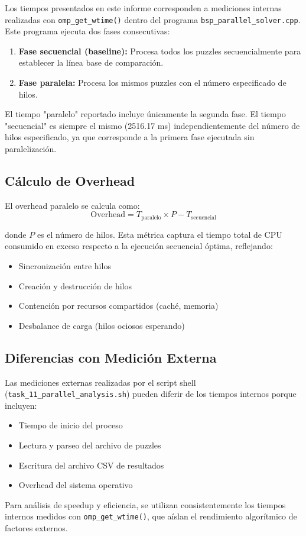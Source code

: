 \documentclass[12pt,a4paper]{article}
\begin{document}
Los tiempos presentados en este informe corresponden a mediciones internas realizadas con \texttt{omp\_get\_wtime()} dentro del programa \texttt{bsp\_parallel\_solver.cpp}. Este programa ejecuta dos fases consecutivas:

\begin{enumerate}
    \item \textbf{Fase secuencial (baseline):} Procesa todos los puzzles secuencialmente para establecer la línea base de comparación.
    \item \textbf{Fase paralela:} Procesa los mismos puzzles con el número especificado de hilos.
\end{enumerate}

El tiempo "paralelo" reportado incluye únicamente la segunda fase. El tiempo "secuencial" es siempre el mismo (2516.17 ms) independientemente del número de hilos especificado, ya que corresponde a la primera fase ejecutada sin paralelización.

\subsection{Cálculo de Overhead}

El overhead paralelo se calcula como:
\begin{equation}
\text{Overhead} = T_{\text{paralelo}} \times P - T_{\text{secuencial}}
\end{equation}

donde $P$ es el número de hilos. Esta métrica captura el tiempo total de CPU consumido en exceso respecto a la ejecución secuencial óptima, reflejando:
\begin{itemize}
    \item Sincronización entre hilos
    \item Creación y destrucción de hilos
    \item Contención por recursos compartidos (caché, memoria)
    \item Desbalance de carga (hilos ociosos esperando)
\end{itemize}

\subsection{Diferencias con Medición Externa}

Las mediciones externas realizadas por el script shell (\texttt{task\_11\_parallel\_analysis.sh}) pueden diferir de los tiempos internos porque incluyen:
\begin{itemize}
    \item Tiempo de inicio del proceso
    \item Lectura y parseo del archivo de puzzles
    \item Escritura del archivo CSV de resultados
    \item Overhead del sistema operativo
\end{itemize}

Para análisis de speedup y eficiencia, se utilizan consistentemente los tiempos internos medidos con \texttt{omp\_get\_wtime()}, que aíslan el rendimiento algorítmico de factores externos.
\end{document}
